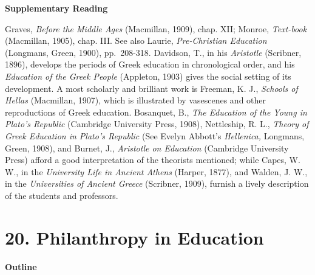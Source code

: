 \documentclass[]{book}
\begin{document}
\textbf{Supplementary Reading}

Graves, \emph{Before the Middle Ages} (Macmillan, 1909), chap. XII; Monroe, \emph{Text-book} (Macmillan, 1905), chap. III. See also Laurie, \emph{Pre-Christian Education} (Longmans, Green, 1900), pp.~208-318. Davidson, T., in his \emph{Aristotle} (Scribner, 1896), develops the periods of Greek education in chronological order, and his \emph{Education of the Greek People} (Appleton, 1903) gives the social setting of its development. A most scholarly and brilliant work is Freeman, K. J., \emph{Schools of Hellas} (Macmillan, 1907), which is illustrated by vasescenes and other reproductions of Greek education. Bosanquet, B., \emph{The Education of the Young in Plato's Republic} (Cambridge University Press, 1908), Nettleship, R. L., \emph{Theory of Greek Education in Plato's Republic} (See Evelyn Abbott's \emph{Hellenica,} Longmans, Green, 1908), and Burnet, J., \emph{Aristotle on Education} (Cambridge University Press) afford a good interpretation of the theorists mentioned; while Capes, W. W., in the \emph{University Life in Ancient Athens} (Harper, 1877), and Walden, J. W., in the \emph{Universities of Ancient Greece} (Scribner, 1909), furnish a lively description of the students and professors.

\hypertarget{philanthropy-in-education}{%
\chapter{20. Philanthropy in Education}\label{philanthropy-in-education}}

\textbf{Outline}
\end{document}
